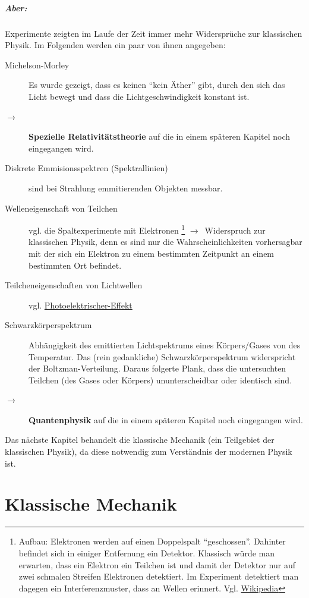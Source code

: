\documentclass[oneside]{book}
\theoremstyle{definition}
\newcommand{\conseq}{$\rightarrow$~}
\begin{document}
\paragraph{Aber:} Experimente zeigten im Laufe der Zeit immer mehr Widersprüche zur klassischen Physik. Im Folgenden werden ein paar von ihnen angegeben:
\begin{description}
	\item[Michelson-Morley] Es wurde gezeigt, dass es keinen "`kein Äther"' gibt, durch den sich das Licht bewegt und dass die Lichtgeschwindigkeit konstant ist.
	\item[\conseq] \textbf{Spezielle Relativitätstheorie} auf die in einem späteren Kapitel noch eingegangen wird.
	\item[Diskrete Emmisionsspektren (Spektrallinien)] sind bei Strahlung emmitierenden Objekten messbar.
	\item[Welleneigenschaft von Teilchen] vgl. die Spaltexperimente mit Elektronen \footnote{Aufbau: Elektronen werden auf einen Doppelspalt "`geschossen"'. Dahinter befindet sich in einiger Entfernung ein Detektor. Klassisch würde man erwarten, dass ein Elektron ein Teilchen ist und damit der Detektor nur auf zwei schmalen Streifen Elektronen detektiert. Im Experiment detektiert man dagegen ein Interferenzmuster, dass an Wellen erinnert. Vgl. \href{http://de.wikipedia.org/wiki/Doppelspaltexperiment}{Wikipedia}} \conseq Widerspruch zur klassischen Physik, denn es sind nur die Wahrscheinlichkeiten vorhersagbar mit der sich ein Elektron zu einem bestimmten Zeitpunkt an einem bestimmten Ort befindet.
	\item[Teilcheneigenschaften von Lichtwellen] vgl. \href{http://de.wikipedia.org/wiki/Photoelektrischer_Effekt}{Photoelektrischer-Effekt}
	\item[Schwarzkörperspektrum] Abhängigkeit des emittierten Lichtspektrums eines Körpers/Gases von des Temperatur. Das (rein gedankliche) Schwarzkörperspektrum widerspricht der Boltzman-Verteilung. Daraus folgerte Plank, dass die untersuchten Teilchen (des Gases oder Körpers) ununterscheidbar oder identisch sind.
	\item[\conseq] \textbf{Quantenphysik} auf die in einem späteren Kapitel noch eingegangen wird.
\end{description}
Das nächste Kapitel behandelt die klassische Mechanik (ein Teilgebiet der klassischen Physik), da diese notwendig zum Verständnis der modernen Physik ist.

\chapter{Klassische Mechanik}
\end{document}
